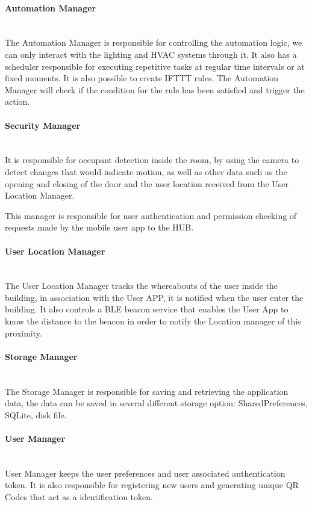 \paragraph{Automation Manager}\mbox{}\\
The Automation Manager is responsible for controlling the automation logic, we can only interact with the lighting and HVAC systems through it. It also has a scheduler responsible for executing repetitive tasks at regular time intervals or at fixed moments. It is also possible to create IFTTT rules. The Automation Manager will check if the condition for the rule has been satisfied and trigger the action.


\paragraph{Security Manager}\mbox{}\\
It is responsible for occupant detection inside the room, by using the camera to detect changes that would indicate motion, as well as other data such as the opening and closing of the door and the user location received from the User Location Manager.

This manager is responsible for user authentication and permission cheeking of requests made by the mobile user app to the HUB.


\paragraph{User Location Manager}\mbox{}\\
The User Location Manager tracks the whereabouts of the user inside the building, in association with the User APP, it is notified when the user enter the building. It also controls a BLE beacon service that enables the User App to know the distance to the beacon in order to notify the Location manager of this proximity.

\paragraph{Storage Manager}\mbox{}\\
The Storage Manager is responsible for saving and retrieving the application data, the data can be saved in several different storage option: SharedPreferences, SQLite, disk file.

\paragraph{User Manager}\mbox{}\\
User Manager keeps the user preferences and user associated authentication token. It is also responsible for registering new users and generating unique QR Codes that act as a identification token.

